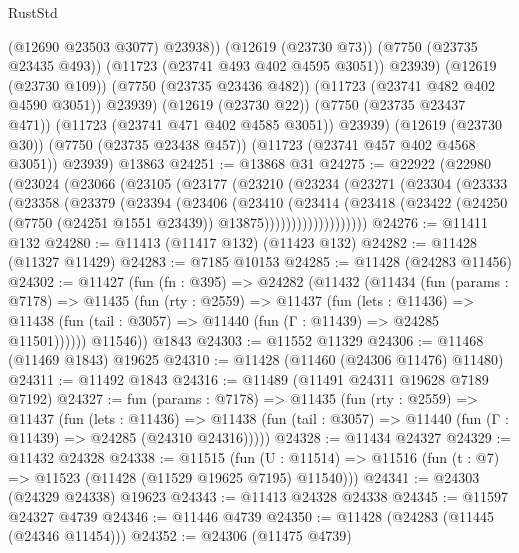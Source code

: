 \begin{lexlean}{RustStd}
\begin{coremodule}
                (@12690 @23503 @3077)
                @23938))
            (@12619 (@23730 @73))
            (@7750 (@23735 @23435 @493))
            (@11723 (@23741 @493 @402 @4595 @3051))
            @23939)
          (@12619 (@23730 @109))
          (@7750 (@23735 @23436 @482))
          (@11723 (@23741 @482 @402 @4590 @3051))
          @23939)
        (@12619 (@23730 @22))
        (@7750 (@23735 @23437 @471))
        (@11723 (@23741 @471 @402 @4585 @3051))
        @23939)
      (@12619 (@23730 @30))
      (@7750 (@23735 @23438 @457))
      (@11723 (@23741 @457 @402 @4568 @3051))
      @23939)
    @13863
@24251 := @13868 @31
@24275 := @22922
    (@22980
      (@23024
        (@23066
          (@23105
            (@23177
              (@23210
                (@23234
                  (@23271
                    (@23304
                      (@23333
                        (@23358
                          (@23379
                            (@23394
                              (@23406
                                (@23410
                                  (@23414
                                    (@23418
                                      (@23422
                                        (@24250
                                          (@7750 (@24251 @1551 @23439))
                                          @13875)))))))))))))))))))
@24276 := @11411 @132
@24280 := @11413 (@11417 @132) (@11423 @132)
@24282 := @11428 (@11327 @11429)
@24283 := @7185 @10153
@24285 := @11428 (@24283 @11456)
@24302 := @11427
    (fun (fn : @395) =>
    @24282
      (@11432
        (@11434
          (fun (params : @7178) =>
          @11435
            (fun (rty : @2559) =>
            @11437
              (fun (lets : @11436) =>
              @11438 (fun (tail : @3057) => @11440 (fun (Γ : @11439) => @24285 @11501))))))
        @11546))
    @1843
@24303 := @11552 @11329
@24306 := @11468 (@11469 @1843) @19625
@24310 := @11428 (@11460 (@24306 @11476) @11480)
@24311 := @11492 @1843
@24316 := @11489 (@11491 @24311 @19628 @7189 @7192)
@24327 := fun (params : @7178) =>
  @11435
    (fun (rty : @2559) =>
    @11437
      (fun (lets : @11436) =>
      @11438 (fun (tail : @3057) => @11440 (fun (Γ : @11439) => @24285 (@24310 @24316)))))
@24328 := @11434 @24327
@24329 := @11432 @24328
@24338 := @11515
    (fun (U : @11514) => @11516 (fun (t : @7) => @11523 (@11428 (@11529 @19625 @7195) @11540)))
@24341 := @24303 (@24329 @24338) @19623
@24343 := @11413 @24328 @24338
@24345 := @11597 @24327 @4739
@24346 := @11446 @4739
@24350 := @11428 (@24283 (@11445 (@24346 @11454)))
@24352 := @24306 (@11475 @4739)

\end{coremodule}
\end{lexlean}
